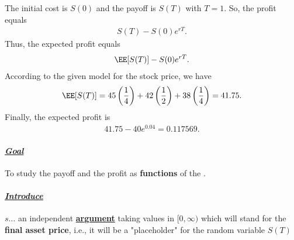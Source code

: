 \documentclass[reqno,letterpaper, onsided,10pt]{amsart}
\newcommand{\sol}[1]{\par\noindent{\bf Solution:} #1}
\begin{document}
\sol{
  The initial cost is $S(0)$ and the payoff is $S(T)$ with $T=1$. So, the profit equals 
  \begin{equation} %
  \nonumber
   \begin{split}
      S(T) - S(0) e^{rT}.  
   \end{split}
  \end{equation}
  Thus, the expected profit equals 
  \begin{equation} %
  \nonumber
   \begin{split}
     \EE[S(T)] - S(0) e^{rT}.  
   \end{split}
  \end{equation}
According to the given model for the stock price, we have 
\begin{equation} %
\nonumber
 \begin{split}
   \EE[S(T)] = 45\left(\frac{1}{4}\right)  +  42\left(\frac{1}{2}\right) +  38 \left(\frac{1}{4}\right) = 41.75.   
 \end{split}
\end{equation}
Finally, the expected profit is 
\begin{equation} %
\nonumber
 \begin{split}
   41.75 - 40 e^{0.04} = 0.117569.   
 \end{split}
\end{equation}
}

\newpage

\paragraph{{\color{huntergreen} \underline{\it Goal}}} 
To study the payoff and the profit as {\color{maroon} {\bf functions}} 
of the {\color{maroon}{\bf final asset price}}. 

\paragraph{{\color{huntergreen} \underline{\it Introduce}}}
{\color{maroon} $s \dots$ an independent \underline{\bf argument} 
taking values in $[0, \infty)$ which will stand for the 
{\color{maroon} \bf final asset price}, i.e., it will be a "placeholder" 
for the random variable $S(T)$
}

\medskip

\newpage
\end{document}
